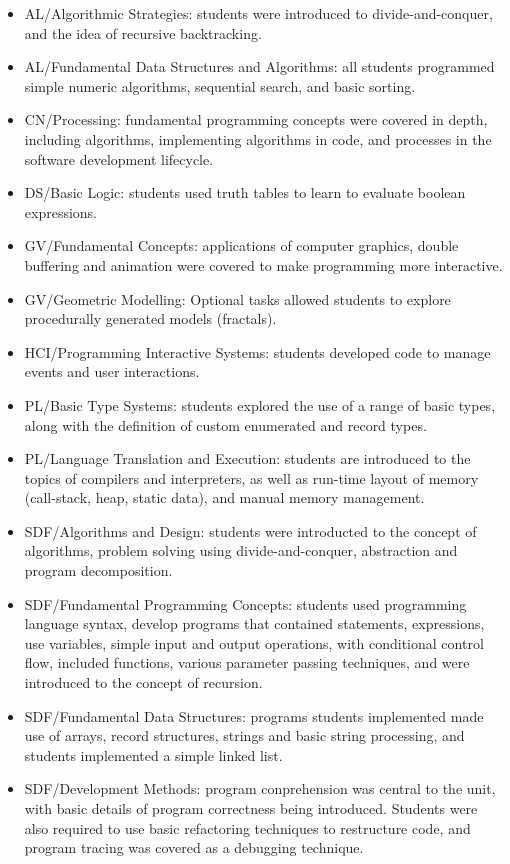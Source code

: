 \begin{itemize}[noitemsep,nolistsep]
	\item AL/Algorithmic Strategies: students were introduced to divide-and-conquer, and the idea of recursive backtracking.
	\item AL/Fundamental Data Structures and Algorithms: all students programmed simple numeric algorithms, sequential search, and basic sorting.
	\item CN/Processing: fundamental programming concepts were covered in depth, including algorithms,  implementing algorithms in code, and processes in the software development lifecycle.
	\item DS/Basic Logic: students used truth tables to learn to evaluate boolean expressions.
	\item GV/Fundamental Concepts: applications of computer graphics, double buffering and animation were covered to make programming more interactive.
	\item GV/Geometric Modelling: Optional tasks allowed students to explore procedurally generated models (fractals).
	\item HCI/Programming Interactive Systems: students developed code to manage events and user interactions.
	\item PL/Basic Type Systems: students explored the use of a range of basic types, along with the definition of custom enumerated and record types.
	\item PL/Language Translation and Execution: students are introduced to the topics of compilers and interpreters, as well as run-time layout of memory (call-stack, heap, static data), and manual memory management.
	\item SDF/Algorithms and Design: students were introducted to the concept of algorithms, problem solving using divide-and-conquer, abstraction and program decomposition.
	\item SDF/Fundamental Programming Concepts: students used programming language syntax, develop programs that contained statements, expressions, use variables, simple input and output operations, with conditional control flow, included functions, various parameter passing techniques, and were introduced to the concept of recursion.
	\item SDF/Fundamental Data Structures: programs students implemented made use of arrays, record structures, strings and basic string processing, and students implemented a simple linked list.
	\item SDF/Development Methods: program conprehension was central to the unit, with basic details of program correctness being introduced. Students were also required to use basic refactoring techniques to restructure code, and program tracing was covered as a debugging technique.

\end{itemize}
